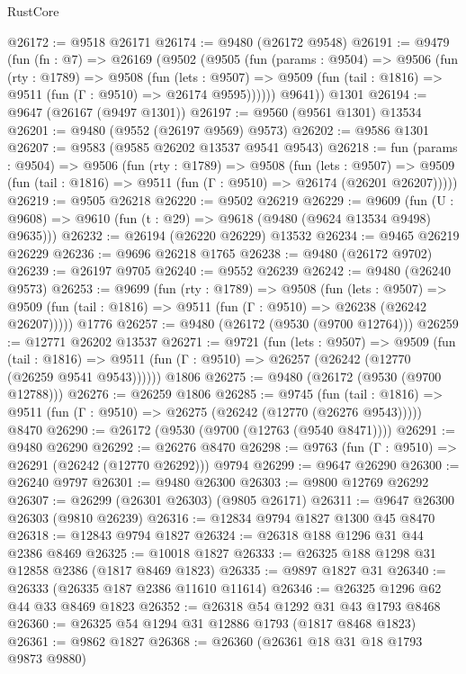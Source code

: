 \begin{lexlean}{RustCore}
\begin{coremodule}
@26172 := @9518 @26171
@26174 := @9480 (@26172 @9548)
@26191 := @9479
    (fun (fn : @7) =>
    @26169
      (@9502
        (@9505
          (fun (params : @9504) =>
          @9506
            (fun (rty : @1789) =>
            @9508
              (fun (lets : @9507) =>
              @9509 (fun (tail : @1816) => @9511 (fun (Γ : @9510) => @26174 @9595))))))
        @9641))
    @1301
@26194 := @9647 (@26167 (@9497 @1301))
@26197 := @9560 (@9561 @1301) @13534
@26201 := @9480 (@9552 (@26197 @9569) @9573)
@26202 := @9586 @1301
@26207 := @9583 (@9585 @26202 @13537 @9541 @9543)
@26218 := fun (params : @9504) =>
  @9506
    (fun (rty : @1789) =>
    @9508
      (fun (lets : @9507) =>
      @9509 (fun (tail : @1816) => @9511 (fun (Γ : @9510) => @26174 (@26201 @26207)))))
@26219 := @9505 @26218
@26220 := @9502 @26219
@26229 := @9609
    (fun (U : @9608) => @9610 (fun (t : @29) => @9618 (@9480 (@9624 @13534 @9498) @9635)))
@26232 := @26194 (@26220 @26229) @13532
@26234 := @9465 @26219 @26229
@26236 := @9696 @26218 @1765
@26238 := @9480 (@26172 @9702)
@26239 := @26197 @9705
@26240 := @9552 @26239
@26242 := @9480 (@26240 @9573)
@26253 := @9699
    (fun (rty : @1789) =>
    @9508
      (fun (lets : @9507) =>
      @9509 (fun (tail : @1816) => @9511 (fun (Γ : @9510) => @26238 (@26242 @26207)))))
    @1776
@26257 := @9480 (@26172 (@9530 (@9700 @12764)))
@26259 := @12771 @26202 @13537
@26271 := @9721
    (fun (lets : @9507) =>
    @9509
      (fun (tail : @1816) =>
      @9511 (fun (Γ : @9510) => @26257 (@26242 (@12770 (@26259 @9541 @9543))))))
    @1806
@26275 := @9480 (@26172 (@9530 (@9700 @12788)))
@26276 := @26259 @1806
@26285 := @9745
    (fun (tail : @1816) => @9511 (fun (Γ : @9510) => @26275 (@26242 (@12770 (@26276 @9543)))))
    @8470
@26290 := @26172 (@9530 (@9700 (@12763 (@9540 @8471))))
@26291 := @9480 @26290
@26292 := @26276 @8470
@26298 := @9763 (fun (Γ : @9510) => @26291 (@26242 (@12770 @26292))) @9794
@26299 := @9647 @26290
@26300 := @26240 @9797
@26301 := @9480 @26300
@26303 := @9800 @12769 @26292
@26307 := @26299 (@26301 @26303) (@9805 @26171)
@26311 := @9647 @26300 @26303 (@9810 @26239)
@26316 := @12834 @9794 @1827 @1300 @45 @8470
@26318 := @12843 @9794 @1827
@26324 := @26318 @188 @1296 @31 @44 @2386 @8469
@26325 := @10018 @1827
@26333 := @26325 @188 @1298 @31 @12858 @2386 (@1817 @8469 @1823)
@26335 := @9897 @1827 @31
@26340 := @26333 (@26335 @187 @2386 @11610 @11614)
@26346 := @26325 @1296 @62 @44 @33 @8469 @1823
@26352 := @26318 @54 @1292 @31 @43 @1793 @8468
@26360 := @26325 @54 @1294 @31 @12886 @1793 (@1817 @8468 @1823)
@26361 := @9862 @1827
@26368 := @26360 (@26361 @18 @31 @18 @1793 @9873 @9880)

\end{coremodule}
\end{lexlean}
